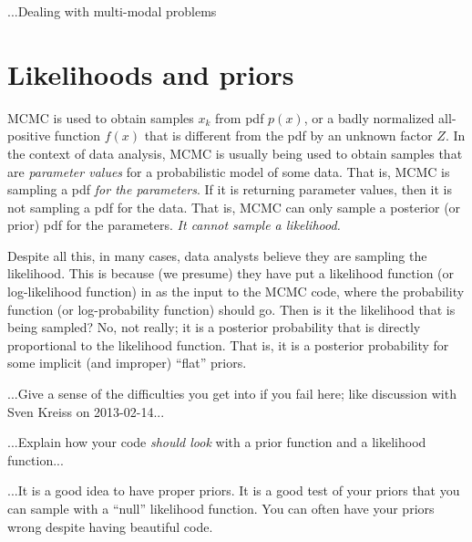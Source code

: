 \documentclass[12pt,twoside,pdftex]{article}
\begin{document}
...Dealing with multi-modal problems

\section{Likelihoods and priors}

MCMC is used to obtain samples $x_k$ from pdf $p(x)$,
  or a badly normalized all-positive function $f(x)$
  that is different from the pdf by an unknown factor $Z$.
In the context of data analysis,
  MCMC is usually being used to obtain samples
  that are \emph{parameter values} for a probabilistic model of some data.
That is, MCMC is sampling a pdf \emph{for the parameters}.
If it is returning parameter values, then it is not sampling a pdf for the data.
That is, MCMC can only sample a posterior (or prior) pdf for the parameters.
\emph{It cannot sample a likelihood.}%

Despite all this, in many cases,
  data analysts believe they are sampling the likelihood.
This is because (we presume) they have put a likelihood function
  (or log-likelihood function)
  in as the input to the MCMC code, where the probability function
  (or log-probability function) should go.
Then is it the likelihood that is being sampled?
No, not really;
  it is a posterior probability that is directly proportional to the likelihood function.
That is, it is a posterior probability for some implicit (and improper) ``flat'' priors.

...Give a sense of the difficulties you get into if you fail here; like
discussion with Sven Kreiss on 2013-02-14...

...Explain how your code \emph{should look} with a prior function and a likelihood function...

...It is a good idea to have proper priors.
It is a good test of your priors that you can sample with a ``null'' likelihood function.
You can often have your priors wrong despite having beautiful code.
\end{document}
